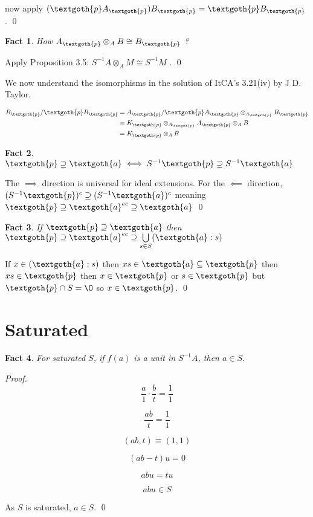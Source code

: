 \documentclass{article}
\newtheorem{theorem}{Fact}[section]
\begin{document}
\noindent
now apply $(\textgoth{p} A_\textgoth{p}) B_\textgoth{p} = \textgoth{p} B_\textgoth{p}$ . 
\qed

\vspace{1.5em}
\begin{theorem}
How $A_\textgoth{p} \otimes_A B \cong B_\textgoth{p}$ ?
\end{theorem}

Apply Proposition 3.5: $S^{-1}A \otimes_A M \cong S^{-1}M$ . 
\qed

\vspace{1em}
We now understand the isomorphisms in the solution of ItCA's 3.21(iv) by J D. Taylor.

\begin{equation*}
\begin{split}
 B_\textgoth{p}/\textgoth{p}B_\textgoth{p} 
 & = A_\textgoth{p}/\textgoth{p}A_\textgoth{p} 
 \otimes_{A_\textgoth{p}} B_\textgoth{p} \\ 
 & = K_\textgoth{p} \otimes_{A_\textgoth{p}} A_\textgoth{p} \otimes_A B \\
 & = K_\textgoth{p} \otimes_A B
\end{split}
\end{equation*}

\bigskip
\begin{theorem}
$\textgoth{p} \supseteq \textgoth{a} \iff S^{-1}\textgoth{p} \supseteq S^{-1}\textgoth{a}$
\end{theorem}

\noindent
The $\implies$ direction is universal for ideal extensions. For the $\impliedby$ direction, 
$(S^{-1}\textgoth{p})^c \supseteq (S^{-1}\textgoth{a})^c$ meaning $\textgoth{p} \supseteq \textgoth{a}^{ec} \supseteq \textgoth{a}$
\qed

\vspace{1.5em}
\begin{theorem}
If $\textgoth{p} \supseteq \textgoth{a}$ then $\textgoth{p} \supseteq \textgoth{a}^{ec} \supseteq \bigcup\limits_{s \in S} (\textgoth{a}:s)$
\end{theorem}

\noindent
If $x \in (\textgoth{a}:s)$ then $xs \in \textgoth{a} \subseteq \textgoth{p}$ then $xs \in \textgoth{p}$ then $x \in \textgoth{p}$ or $s \in \textgoth{p}$ but $\textgoth{p} \cap S = \O$ so $x \in \textgoth{p}$. 
\qed

\section{Saturated}

\begin{theorem}
For saturated $S$, if $f(a)$ is a unit in $S^{-1}A$, then $a \in S$.
\end{theorem}

\noindent
\textit{Proof.}
\[
  \frac{a}{1} \cdot \frac{b}{t} = \frac{1}{1} 
\]

\[
  \frac{ab}{t} = \frac{1}{1}
\]

\[
   (ab, t) \equiv (1, 1)
\]
 
\[
   (ab - t)u = 0
\]

\[
   abu = tu
\]

\[
   abu \in S
\]

As \( S \) is saturated, \( a \in S \).  \qed
\end{document}
